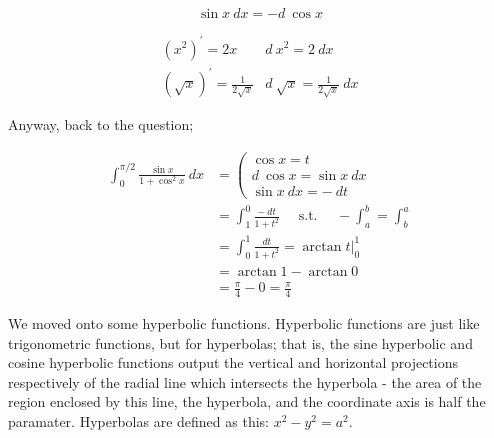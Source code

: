\documentclass{article}
\begin{document}
\[\sin x\ dx=-d\ \cos x\]

\[\begin{array}{cc}(x^2)^\prime=2x&d\ x^2=2\ dx\\
(\sqrt{x})^\prime=\frac{1}{2\sqrt{x}}&d\ \sqrt{x}=\frac{1}{2\sqrt{x}}\ dx\end{array}\]

\vspace{10pt}

Anyway, back to the question;

\begin{align*}
\int_0^{\pi/2}\frac{\sin x}{1+\cos^2x}\ dx&=\left(\begin{array}{c}\cos x=t\\d\ \cos x=\sin x\ dx\\\sin x\ dx=-\ dt\end{array}\right.\\
&=\int_1^0\frac{-\ dt}{1+t^2}\quad\mbox{ s.t. }\quad-\int_a^b=\int_b^a\\
&=\int_0^1\frac{dt}{1+t^2}=\arctan t\Big|_0^1\\
&=\arctan1-\arctan0\\
&=\frac{\pi}{4}-0=\frac{\pi}{4}
\end{align*}

\vspace{10pt}

We moved onto some hyperbolic functions. Hyperbolic functions are just like trigonometric functions,  but for hyperbolas; that is, the sine hyperbolic and cosine hyperbolic functions output the vertical and horizontal projections respectively of the radial line which intersects the hyperbola - the area of the region enclosed by this line, the hyperbola, and the coordinate axis is half the paramater. Hyperbolas are defined as this: $x^2-y^2=a^2$.
\end{document}
